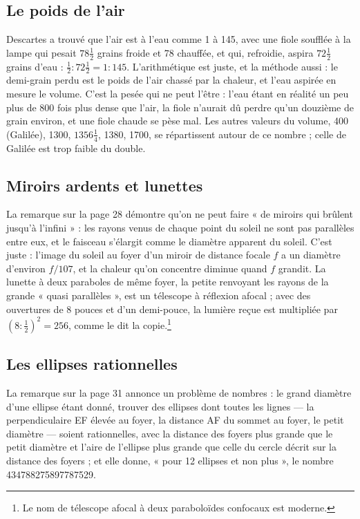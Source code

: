 \documentclass[11pt,a4paper]{article}
\begin{document}
\subsection*{Le poids de l'air}

Descartes a trouvé que l'air est à l'eau comme 1 à 145, avec une fiole soufflée
à la lampe qui pesait $78\frac12$ grains froide et 78 chauffée, et qui, refroidie,
aspira $72\frac12$ grains d'eau : $\frac12 : 72\frac12 = 1 : 145$. L'arithmétique
est juste, et la méthode aussi : le demi-grain perdu est le poids de l'air chassé
par la chaleur, et l'eau aspirée en mesure le volume. C'est la pesée qui ne peut
l'être : l'eau étant en réalité un peu plus de 800 fois plus dense que l'air, la
fiole n'aurait dû perdre qu'un douzième de grain environ, et une fiole chaude
se pèse mal. Les
autres valeurs du volume, 400 (Galilée), 1300, $1356\frac14$, 1380, 1700, se
répartissent autour de ce nombre ; celle de Galilée est trop faible du double.

\subsection*{Miroirs ardents et lunettes}

La remarque sur la page 28 démontre qu'on ne peut faire « de miroirs qui
brûlent jusqu'à l'infini » : les rayons venus de chaque point du soleil ne sont
pas parallèles entre eux, et le faisceau s'élargit comme le diamètre apparent
du soleil. C'est juste : l'image du soleil au foyer d'un miroir de distance
focale $f$ a un diamètre d'environ $f/107$, et la chaleur qu'on concentre
diminue quand $f$ grandit. La lunette à deux paraboles de même foyer, la petite
renvoyant les rayons de la grande « quasi parallèles », est un télescope à
réflexion afocal ; avec des ouvertures de 8 pouces et d'un demi-pouce, la
lumière reçue est multipliée par $(8 : \frac12)^2 = 256$, comme le dit la
copie.\footnote{Le nom de télescope afocal à deux paraboloïdes confocaux est
moderne.}

\subsection*{Les ellipses rationnelles}

La remarque sur la page 31 annonce un problème de nombres : le grand diamètre
d'une ellipse étant donné, trouver des ellipses dont toutes les lignes — la
perpendiculaire EF élevée au foyer, la distance AF du sommet au foyer, le petit
diamètre — soient rationnelles, avec la distance des foyers plus grande que le
petit diamètre et l'aire de l'ellipse plus grande que celle du cercle décrit
sur la distance des foyers ; et elle donne, « pour 12 ellipses et non plus », le
nombre 434788275897787529.
\end{document}
